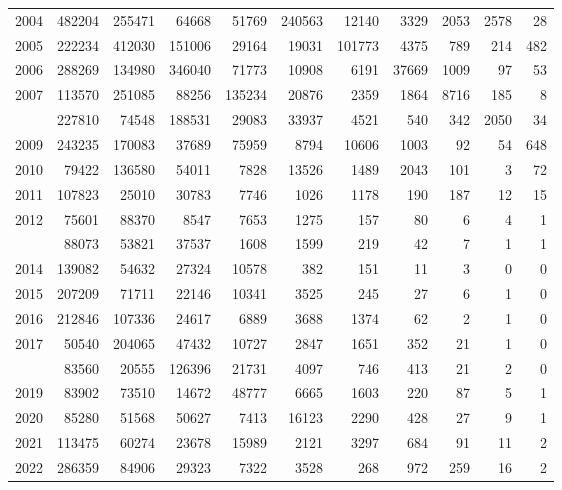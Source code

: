 \documentclass[
]{article}
\begin{document}
\begin{longtable}[t]{lrrrrrrrrrr}
2004 & 482204 & 255471 & 64668 & 51769 & 240563 & 12140 & 3329 & 2053 & 2578 & 28\\
2005 & 222234 & 412030 & 151006 & 29164 & 19031 & 101773 & 4375 & 789 & 214 & 482\\
2006 & 288269 & 134980 & 346040 & 71773 & 10908 & 6191 & 37669 & 1009 & 97 & 53\\
2007 & 113570 & 251085 & 88256 & 135234 & 20876 & 2359 & 1864 & 8716 & 185 & 8\\
\addlinespace
2008 & 227810 & 74548 & 188531 & 29083 & 33937 & 4521 & 540 & 342 & 2050 & 34\\
2009 & 243235 & 170083 & 37689 & 75959 & 8794 & 10606 & 1003 & 92 & 54 & 648\\
2010 & 79422 & 136580 & 54011 & 7828 & 13526 & 1489 & 2043 & 101 & 3 & 72\\
2011 & 107823 & 25010 & 30783 & 7746 & 1026 & 1178 & 190 & 187 & 12 & 15\\
2012 & 75601 & 88370 & 8547 & 7653 & 1275 & 157 & 80 & 6 & 4 & 1\\
\addlinespace
2013 & 88073 & 53821 & 37537 & 1608 & 1599 & 219 & 42 & 7 & 1 & 1\\
2014 & 139082 & 54632 & 27324 & 10578 & 382 & 151 & 11 & 3 & 0 & 0\\
2015 & 207209 & 71711 & 22146 & 10341 & 3525 & 245 & 27 & 6 & 1 & 0\\
2016 & 212846 & 107336 & 24617 & 6889 & 3688 & 1374 & 62 & 2 & 1 & 0\\
2017 & 50540 & 204065 & 47432 & 10727 & 2847 & 1651 & 352 & 21 & 1 & 0\\
\addlinespace
2018 & 83560 & 20555 & 126396 & 21731 & 4097 & 746 & 413 & 21 & 2 & 0\\
2019 & 83902 & 73510 & 14672 & 48777 & 6665 & 1603 & 220 & 87 & 5 & 1\\
2020 & 85280 & 51568 & 50627 & 7413 & 16123 & 2290 & 428 & 27 & 9 & 1\\
2021 & 113475 & 60274 & 23678 & 15989 & 2121 & 3297 & 684 & 91 & 11 & 2\\
2022 & 286359 & 84906 & 29323 & 7322 & 3528 & 268 & 972 & 259 & 16 & 2\\*
\end{longtable}
\end{document}
